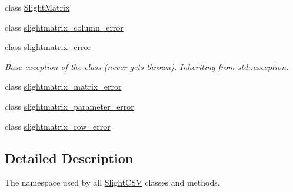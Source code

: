 \begin{DoxyCompactItemize}
\item 
class \hyperlink{classutils_1_1SlightMatrix}{Slight\+Matrix}
\item 
class \hyperlink{classutils_1_1slightmatrix__column__error}{slightmatrix\+\_\+column\+\_\+error}
\item 
class \hyperlink{classutils_1_1slightmatrix__error}{slightmatrix\+\_\+error}
\begin{DoxyCompactList}\small\item\em Base exception of the class (never gets thrown). Inheriting from std\+::exception. \end{DoxyCompactList}\item 
class \hyperlink{classutils_1_1slightmatrix__matrix__error}{slightmatrix\+\_\+matrix\+\_\+error}
\item 
class \hyperlink{classutils_1_1slightmatrix__parameter__error}{slightmatrix\+\_\+parameter\+\_\+error}
\item 
class \hyperlink{classutils_1_1slightmatrix__row__error}{slightmatrix\+\_\+row\+\_\+error}
\end{DoxyCompactItemize}


\subsection{Detailed Description}
The namespace used by all \hyperlink{classutils_1_1SlightCSV}{Slight\+C\+SV} classes and methods. 